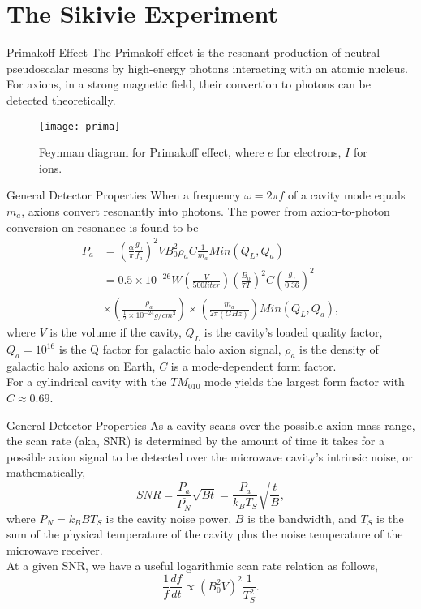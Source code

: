 \documentclass{beamer}
\begin{document}
\section{The Sikivie Experiment}
\begin{frame}{Primakoff Effect}
The Primakoff effect is the resonant production of neutral pseudoscalar mesons by high-energy photons interacting with an atomic nucleus. \\
For axions, in a strong magnetic field, their convertion to photons can be detected theoretically.
\begin{figure}
    \caption{Feynman diagram for Primakoff effect, where $e$ for electrons, $I$ for ions.}
    \centering
    \texttt{[image: prima]}
\end{figure}
\end{frame}
\begin{frame}{General Detector Properties}
When a frequency $\omega=2 \pi f$ of a cavity mode equals $m_a$, axions convert resonantly into photons. The power from axion-to-photon conversion
on resonance is found to be
\begin{equation*}
\begin{split}
P_a &= (\frac{\alpha}{\pi} \frac{g_\gamma}{f_a})^2 V B_0^2 \rho_a C \frac{1}{m_a} Min(Q_L,Q_a)\\
&=0.5\times10^{-26}W(\frac{V}{500 liter})(\frac{B_0}{7 T})^2 C (\frac{g_\gamma}{0.36})^2\\
&\times (\frac{\rho_a}{\frac{1}{2}\times10^{-24}g/cm^3})\times (\frac{m_a}{2\pi(GHz)})Min(Q_L,Q_a),
\end{split}
\end{equation*}
where $V$ is the volume if the cavity, $Q_L$ is the cavity's loaded quality factor, $Q_a = 10^{16}$ is the Q factor for galactic halo axion signal, $\rho_a$ is the density of galactic halo axions on Earth, $C$ is a mode-dependent form factor.\\
For a cylindrical cavity with  the $TM_{010}$ mode yields the largest form factor with $C \approx 0.69$.
\end{frame}
\begin{frame}{General Detector Properties}
As a cavity scans over the
possible axion mass range, the scan rate (aka, SNR) is determined
by the amount of time it takes for a possible axion signal
to be detected over the microwave cavity’s intrinsic noise, or mathematically,$$
SNR = \frac{P_a}{\bar{P_N}}\sqrt{Bt} = \frac{P_a}{k_BT_S}\sqrt{\frac{t}{B}},$$
where $\bar{P_N}= k_BBT_S$ is the cavity noise power, $B$ is the bandwidth, and $T_S$
is the sum of the physical
temperature of the cavity plus the noise temperature of
the microwave receiver.\\
At a given SNR, we have a useful logarithmic scan rate relation as follows,
$$\frac{1}{f}\frac{df}{dt} \propto (B_0^2V)^2\frac{1}{T_S^2}.$$
\end{frame}
\end{document}
